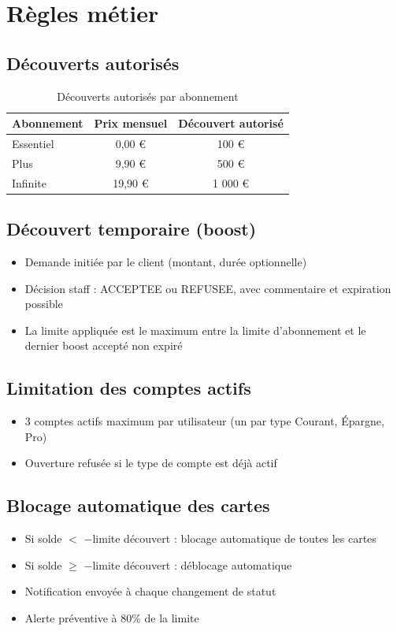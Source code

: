 \documentclass[12pt,a4paper]{report}
\begin{document}
\section{Règles métier}

\subsection{Découverts autorisés}
\begin{table}[H]
\centering
\begin{tabular}{|l|c|c|}
\hline
\rowcolor{banquiseblue!30}
\textbf{Abonnement} & \textbf{Prix mensuel} & \textbf{Découvert autorisé} \\
\hline
Essentiel & 0,00 € & 100 € \\
\hline
Plus & 9,90 € & 500 € \\
\hline
Infinite & 19,90 € & 1 000 € \\
\hline
\end{tabular}
\caption{Découverts autorisés par abonnement}
\end{table}

\subsection{Découvert temporaire (boost)}
\begin{itemize}[leftmargin=1.5cm]
    \item Demande initiée par le client (montant, durée optionnelle)
    \item Décision staff : ACCEPTEE ou REFUSEE, avec commentaire et expiration possible
    \item La limite appliquée est le maximum entre la limite d'abonnement et le dernier boost accepté non expiré
\end{itemize}

\subsection{Limitation des comptes actifs}
\begin{itemize}[leftmargin=1.5cm]
    \item 3 comptes actifs maximum par utilisateur (un par type Courant, Épargne, Pro)
    \item Ouverture refusée si le type de compte est déjà actif
\end{itemize}

\subsection{Blocage automatique des cartes}
\begin{itemize}[leftmargin=1.5cm]
    \item Si solde $<$ $-$limite découvert : blocage automatique de toutes les cartes
    \item Si solde $\geq$ $-$limite découvert : déblocage automatique
    \item Notification envoyée à chaque changement de statut
    \item Alerte préventive à 80\% de la limite
\end{itemize}
\end{document}
